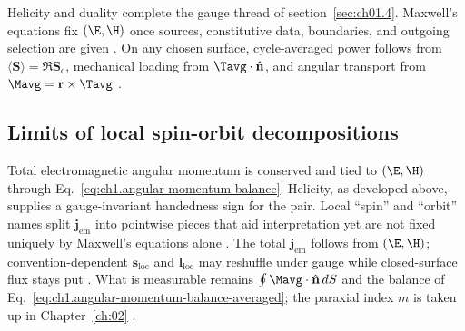 Helicity and duality complete the gauge thread of section~\ref{sec:ch01.4}. Maxwell's equations fix $(\E,\H)$ once sources, constitutive data, boundaries, and outgoing selection are given \cite{maxwell1873,stratton1941}. On any chosen surface, cycle-averaged power follows from $\langle\mathbf{S}\rangle=\Re\mathbf{S}_\mathrm{c}$, mechanical loading from $\Tavg\cdot\hat{\mathbf{n}}$, and angular transport from $\Mavg=\mathbf{r}\times\Tavg$ \cite{poynting1884,beth1936}.

\label{sec:ch01.4.4}
\subsection{Limits of local spin-orbit decompositions}
\label{sec:ch01.4.5}

Total electromagnetic angular momentum is conserved and tied to $(\E,\H)$ through Eq.~\eqref{eq:ch1.angular-momentum-balance}. Helicity, as developed above, supplies a gauge-invariant handedness sign for the pair. Local ``spin'' and ``orbit'' names split $\mathbf{j}_{\mathrm{em}}$ into pointwise pieces that aid interpretation yet are not fixed uniquely by Maxwell's equations alone \cite{belinfante1940,stratton1941}. The total $\mathbf{j}_{\mathrm{em}}$ follows from $(\E,\H)$; convention-dependent $\mathbf{s}_{\mathrm{loc}}$ and $\mathbf{l}_{\mathrm{loc}}$ may reshuffle under gauge while closed-surface flux stays put \cite{belinfante1940,stratton1941}. What is measurable remains $\oint \Mavg\cdot\hat{\mathbf{n}}\,dS$ and the balance of Eq.~\eqref{eq:ch1.angular-momentum-balance-averaged}; the paraxial index $m$ is taken up in Chapter~\ref{ch:02} \cite{allen1992}.

